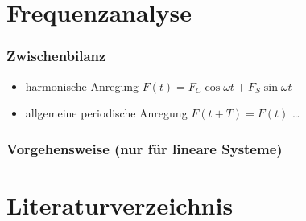 \documentclass[hyperref={pdfpagemode=FullScreen, colorlinks=false}]{beamer}
\begin{document}
\maketitle

\section{Frequenzanalyse}

\begin{frame}
\frametitle{Zwischenbilanz}



\begin{itemize}[<+->]
 \item harmonische Anregung $F(t)=  F_C\cos\omega t + F_S\sin\omega t$ {\Large \color{green}\checkmark}
 \item allgemeine periodische Anregung $F(t+T)=F(t)$ \dots
\end{itemize}
\end{frame}

\begin{frame}
\frametitle{Vorgehensweise \normalsize{(nur für lineare Systeme)}}



\end{frame}






\section*{Literaturverzeichnis}

\begin{frame}[allowframebreaks]{}
	\printbibliography
\end{frame}
\end{document}
